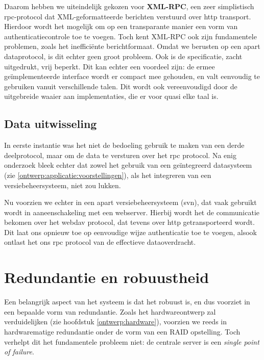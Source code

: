 Daarom hebben we uiteindelijk gekozen voor \textbf{XML-RPC}, een zeer simplistisch \ac{rpc}-protocol dat XML-geformatteerde berichten verstuurd over \ac{http} transport. Hierdoor wordt het mogelijk om op een transparante manier een vorm van authenticatiecontrole toe te voegen. Toch kent XML-RPC ook zijn fundamentele problemen, zoals het inefficiënte berichtformaat. Omdat we berusten op een apart dataprotocol, is dit echter geen groot probleem. Ook is de specificatie, zacht uitgedrukt, vrij beperkt. Dit kan echter een voordeel zijn: de ermee geïmplementeerde interface wordt er compact mee gehouden, en valt eenvoudig te gebruiken vanuit verschillende talen. Dit wordt ook vereenvoudigd door de uitgebreide waaier aan implementaties, die er voor quasi elke taal is.

\subsection{Data uitwisseling}

In eerste instantie was het niet de bedoeling gebruik te maken van een derde deelprotocol, maar om de data te versturen over het \ac{rpc} protocol. Na enig onderzoek bleek echter dat zowel het gebruik van een geïntegreerd datasysteem (zie \ref{ontwerp:applicatie:voorstellingen}), als het integreren van een versiebeheersysteem, niet zou lukken.

Nu voorzien we echter in een apart versiebeheersysteem (\ac{svn}), dat vaak gebruikt wordt in aaneenschakeling met een webserver. Hierbij wordt het de communicatie bekomen over het \ac{webdav} protocol, dat tevens over \ac{http} getransporteerd wordt. Dit laat ons opnieuw toe op eenvoudige wijze authenticatie toe te voegen, alsook ontlast het ons \ac{rpc} protocol van de effectieve dataoverdracht.

\section{Redundantie en robuustheid}
\label{sec:redundantie}

Een belangrijk aspect van het systeem is dat het robuust is, en dus voorziet in een bepaalde vorm van redundantie. Zoals het hardwareontwerp zal verduidelijken (zie hoofdstuk \ref{ontwerp:hardware}), voorzien we reeds in hardwarematige redundantie onder de vorm van een RAID opstelling. Toch verhelpt dit het fundamentele probleem niet: de centrale server is een \emph{single point of failure}.

